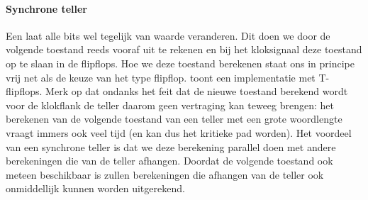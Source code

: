 \paragraph{Synchrone teller}
Een  laat alle bits wel tegelijk van waarde veranderen. Dit doen we door de volgende toestand reeds vooraf uit te rekenen en bij het kloksignaal deze toestand op te slaan in de flipflops. Hoe we deze toestand berekenen staat ons in principe vrij net als de keuze van het type flipflop.  toont een implementatie met T-flipflops. Merk op dat ondanks het feit dat de nieuwe toestand berekend wordt voor de klokflank de teller daarom geen vertraging kan teweeg brengen: het berekenen van de volgende toestand van een teller met een grote woordlengte vraagt immers ook veel tijd (en kan dus het kritieke pad worden). Het voordeel van een synchrone teller is dat we deze berekening parallel doen met andere berekeningen die van de teller afhangen. Doordat de volgende toestand ook meteen beschikbaar is zullen berekeningen die afhangen van de teller ook onmiddellijk kunnen worden uitgerekend.

